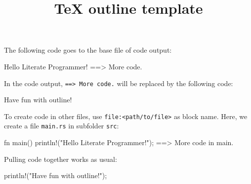 \documentclass[11pt,a4paper]{article}
\title{TeX outline template}
\begin{document}
\maketitle

The following code goes to the base file of code output:

\begin{code}
Hello Literate Programmer!
==> More code.
\end{code}

In the code output, \verb`==> More code.` will be replaced by the following code:

\begin{code}[name=More code]
Have fun with outline!
\end{code}

To create code in other files, use \verb`file:<path/to/file>` as block name.
Here, we create a file \verb`main.rs` in subfolder \verb`src`:

\begin{code}[language=rust,name=file:src/main.rs]
fn main() {
    println!("Hello Literate Programmer!");
    ==> More code in main.
}
\end{code}

Pulling code together works as usual:

\begin{code}[language=rust,name=More code in main]
println!("Have fun with outline!");
\end{code}
\end{document}
